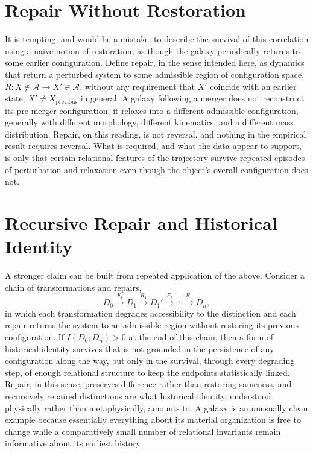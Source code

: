 \documentclass[11pt]{article}
\begin{document}
\section{Repair Without Restoration}

It is tempting, and would be a mistake, to describe the survival of this correlation using a naive notion of restoration, as though the galaxy periodically returns to some earlier configuration. Define repair, in the sense intended here, as dynamics that return a perturbed system to some admissible region of configuration space, $R: X \notin \mathcal A \to X' \in \mathcal A$, without any requirement that $X'$ coincide with an earlier state, $X' \neq X_{\mathrm{previous}}$ in general. A galaxy following a merger does not reconstruct its pre-merger configuration; it relaxes into a different admissible configuration, generally with different morphology, different kinematics, and a different mass distribution. Repair, on this reading, is not reversal, and nothing in the empirical result requires reversal. What is required, and what the data appear to support, is only that certain relational features of the trajectory survive repeated episodes of perturbation and relaxation even though the object's overall configuration does not.

\section{Recursive Repair and Historical Identity}

A stronger claim can be built from repeated application of the above. Consider a chain of transformations and repairs,
\begin{equation}
D_0 \xrightarrow{F_1} D_1 \xrightarrow{R_1} D_1' \xrightarrow{F_2} \cdots \xrightarrow{R_n} D_n,
\end{equation}
in which each transformation degrades accessibility to the distinction and each repair returns the system to an admissible region without restoring its previous configuration. If $I(D_0; D_n) > 0$ at the end of this chain, then a form of historical identity survives that is not grounded in the persistence of any configuration along the way, but only in the survival, through every degrading step, of enough relational structure to keep the endpoints statistically linked. Repair, in this sense, preserves difference rather than restoring sameness, and recursively repaired distinctions are what historical identity, understood physically rather than metaphysically, amounts to. A galaxy is an unusually clean example because essentially everything about its material organization is free to change while a comparatively small number of relational invariants remain informative about its earliest history.
\end{document}
